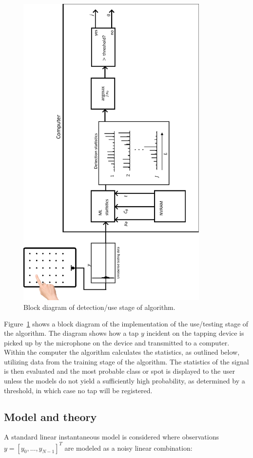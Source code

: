 \begin{figure}[!]
\centering
\includegraphics[width=360px]{testingSystemPlot.pdf}
\caption{Block diagram of detection/use stage of algorithm.}\label{fig:testingSystemPlot}
\end{figure}

Figure~\ref{fig:testingSystemPlot} shows a block diagram of the implementation of the use/testing stage of the algorithm. The diagram shows how a tap $y$ incident on the tapping device is picked up by the microphone on the device and transmitted to a computer. Within the computer the algorithm calculates the statistics, as outlined below, utilizing data from the training stage of the algorithm. The statistics of the signal is then evaluated and the most probable class or spot is displayed to the user unless the models do not yield a sufficiently high probability, as determined by a threshold, in which case no tap will be registered.

\subsection{Model and theory}
A standard linear instantaneous model is considered where observations $y = [y_0, \ldots , y_{N-1}]^T $ are modeled as a noisy linear combination:

